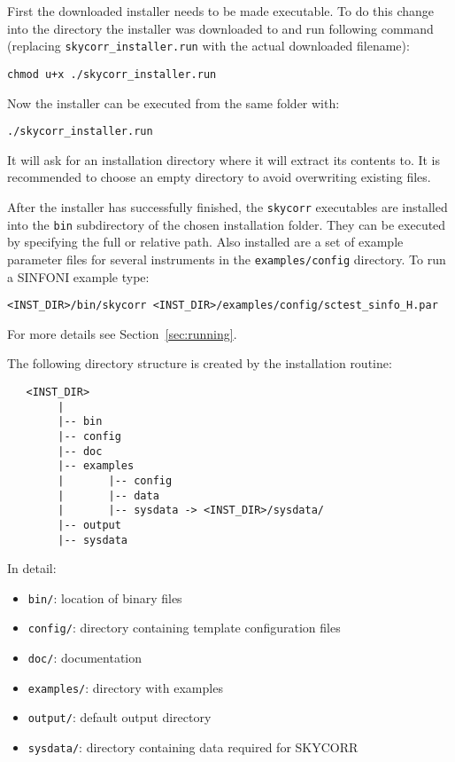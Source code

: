 First the downloaded installer needs to be made executable. To do this change
into the directory the installer was downloaded to and run following command
(replacing {\tt skycorr\_installer.run} with the actual downloaded filename):

\begin{verbatim}
chmod u+x ./skycorr_installer.run
\end{verbatim}

Now the installer can be executed from the same folder with:

\begin{verbatim}
./skycorr_installer.run
\end{verbatim}

It will ask for an installation directory where it will extract its
contents to. It is recommended to choose an empty directory to avoid
overwriting existing files.

After the installer has successfully finished, the {\tt skycorr} executables
are installed into the \texttt{bin} subdirectory of the chosen installation
folder. They can be executed by specifying the full or relative path.
Also installed are a set of example parameter files for several
instruments in the \texttt{examples/config} directory. To run a SINFONI example
type:

\begin{verbatim}
<INST_DIR>/bin/skycorr <INST_DIR>/examples/config/sctest_sinfo_H.par
\end{verbatim}

For more details see Section~\ref{sec:running}.

The following directory structure is created by the installation routine:

\begin{verbatim}
   <INST_DIR>
        |
        |-- bin
        |-- config
        |-- doc
        |-- examples
        |       |-- config
        |       |-- data
        |       |-- sysdata -> <INST_DIR>/sysdata/
        |-- output
        |-- sysdata

\end{verbatim}
In detail:
\begin{itemize}
  \item {\tt bin/}: location of binary files
  \item {\tt config/}: directory containing template configuration files
  \item {\tt doc/}: documentation
  \item {\tt examples/}: directory with examples
  \item {\tt output/}: default output directory
  \item {\tt sysdata/}: directory containing data required for SKYCORR
\end{itemize}



